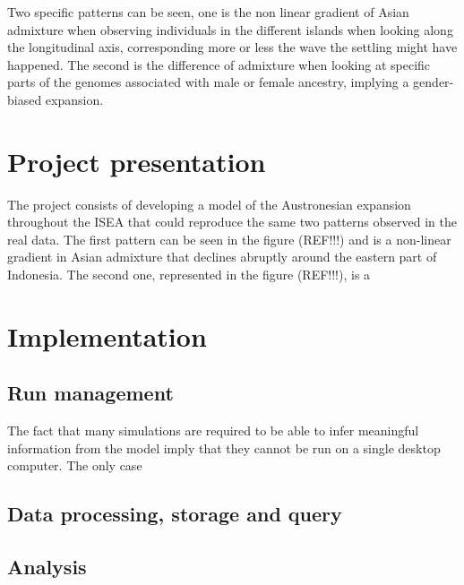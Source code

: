 \documentclass[a4paper,11pt]{report}
\begin{document}
Two specific patterns can be seen, one is the non linear gradient of Asian admixture when observing individuals in the different islands when looking along the longitudinal axis, corresponding more or less the wave the settling might have happened. The second is the difference of admixture when looking at specific parts of the genomes associated with male or female ancestry, implying a gender-biased expansion.


\chapter{Project presentation}
The project consists of developing a model of the Austronesian expansion throughout the ISEA that could reproduce the same two patterns observed in the real data.
The first pattern can be seen in the figure (REF!!!) and is a non-linear gradient in Asian admixture that declines abruptly around the eastern part of Indonesia. The second one, represented in the figure (REF!!!), is a 


\chapter{Implementation}

\section{Run management}
The fact that many simulations are required to be able to infer meaningful information from the model imply that they cannot be run on a single desktop computer. The only case

\section{Data processing, storage and query}


\section{Analysis}
\end{document}
